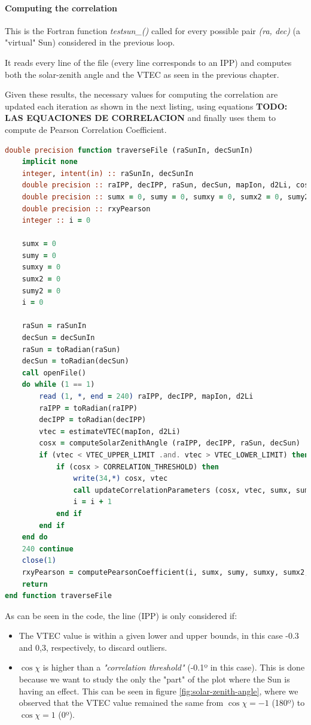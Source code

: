 \paragraph{Computing the correlation}

This is the Fortran function \textit{testsun\_()} called for every possible pair \textit{(ra, dec)} (a "virtual" Sun) considered in the previous loop.

It reads every line of the file (every line corresponds to an IPP) and computes both the solar-zenith angle and the VTEC as seen in the previous chapter.

Given these results, the necessary values for computing the correlation are updated each iteration as shown in the next listing, using equations \textbf{TODO: LAS EQUACIONES DE CORRELACION} and finally uses them to compute de Pearson Correlation Coefficient.

\begin{lstlisting}[language=Fortran, caption=Correlation computation]
double precision function traverseFile (raSunIn, decSunIn)
	implicit none
	integer, intent(in) :: raSunIn, decSunIn
	double precision :: raIPP, decIPP, raSun, decSun, mapIon, d2Li, cosX, vtec
	double precision :: sumx = 0, sumy = 0, sumxy = 0, sumx2 = 0, sumy2 = 0
	double precision :: rxyPearson
	integer :: i = 0
	
	sumx = 0
	sumy = 0
	sumxy = 0
	sumx2 = 0
	sumy2 = 0
	i = 0
	
	raSun = raSunIn
	decSun = decSunIn
	raSun = toRadian(raSun)
	decSun = toRadian(decSun)
	call openFile()
	do while (1 == 1)
		read (1, *, end = 240) raIPP, decIPP, mapIon, d2Li
		raIPP = toRadian(raIPP)
		decIPP = toRadian(decIPP)
		vtec = estimateVTEC(mapIon, d2Li)
		cosx = computeSolarZenithAngle (raIPP, decIPP, raSun, decSun)
		if (vtec < VTEC_UPPER_LIMIT .and. vtec > VTEC_LOWER_LIMIT) then
			if (cosx > CORRELATION_THRESHOLD) then
				write(34,*) cosx, vtec
				call updateCorrelationParameters (cosx, vtec, sumx, sumy, sumxy, sumx2, sumy2)
				i = i + 1
			end if
		end if	
	end do
	240 continue
	close(1)
	rxyPearson = computePearsonCoefficient(i, sumx, sumy, sumxy, sumx2, sumy2)
	return
end function traverseFile
\end{lstlisting}

As can be seen in the code, the line (IPP) is only considered if:

\begin{itemize}
	\item The VTEC value is within a given lower and upper bounds, in this case -0.3 and 0,3, respectively, to discard outliers.
	\item $\cos\chi$ is higher than a \textit{"correlation threshold"} (-0.1º in this case). This is done because we want to study the only the "part" of the plot where the Sun is having an effect. This can be seen in figure \ref{fig:solar-zenith-angle}, where we observed that the VTEC value remained the same from $\cos\chi = -1$ (180º) to $\cos\chi = 1$ (0º).
\end{itemize}

